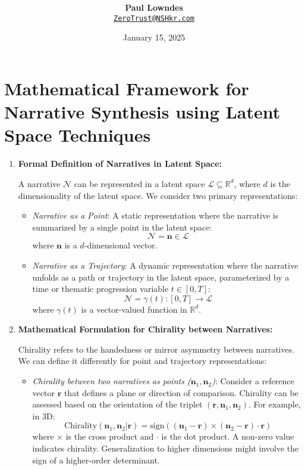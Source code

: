 \documentclass[12pt, a4paper]{article}
\title{\vspace{-2cm}\textbf{}}
\author{\textbf{Paul Lowndes} \\ \href{mailto:ZeroTrust@NSHkr.com}{\texttt{ZeroTrust@NSHkr.com}}}
\date{\small January 15, 2025}
\begin{document}
\maketitle
\vspace{-1.5em}
\section*{Mathematical Framework for Narrative Synthesis using Latent Space Techniques}

\begin{enumerate} \item \textbf{Formal Definition of Narratives in Latent Space:}

A narrative $\mathcal{N}$ can be represented in a latent space $\mathcal{L} \subseteq \mathbb{R}^d$, where $d$ is the dimensionality of the latent space. We consider two primary representations:

\begin{itemize}
    \item \textit{Narrative as a Point}:  A static representation where the narrative is summarized by a single point in the latent space:
    \begin{equation*}
        \mathcal{N} = \mathbf{n} \in \mathcal{L}
    \end{equation*}
    where $\mathbf{n}$ is a $d$-dimensional vector.

    \item \textit{Narrative as a Trajectory}: A dynamic representation where the narrative unfolds as a path or trajectory in the latent space, parameterized by a time or thematic progression variable $t \in [0, T]$:
    \begin{equation*}
        \mathcal{N} = \gamma(t) : [0, T] \rightarrow \mathcal{L}
    \end{equation*}
    where $\gamma(t)$ is a vector-valued function in $\mathbb{R}^d$.
\end{itemize}

\item \textbf{Mathematical Formulation for Chirality between Narratives:}

Chirality refers to the handedness or mirror asymmetry between narratives.  We can define it differently for point and trajectory representations:

\begin{itemize}
    \item \textit{Chirality between two narratives as points ($\mathbf{n}_1, \mathbf{n}_2$)}:  Consider a reference vector $\mathbf{r}$ that defines a plane or direction of comparison. Chirality can be assessed based on the orientation of the triplet $(\mathbf{r}, \mathbf{n}_1, \mathbf{n}_2)$.  For example, in 3D:
    \begin{equation*}
        \text{Chirality}(\mathbf{n}_1, \mathbf{n}_2 | \mathbf{r}) = \text{sign}((\mathbf{n}_1 - \mathbf{r}) \times (\mathbf{n}_2 - \mathbf{r}) \cdot \mathbf{r})
    \end{equation*}
    where $\times$ is the cross product and $\cdot$ is the dot product.  A non-zero value indicates chirality.  Generalization to higher dimensions might involve the sign of a higher-order determinant.


\end{itemize}
\end{enumerate}
\end{document}
